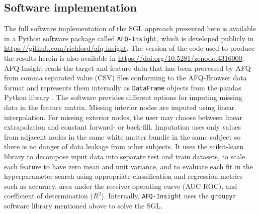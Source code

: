 \documentclass[10pt,letterpaper]{article}
\begin{document}
\begin{figure}[h!]
\end{figure}

\subsection*{Software implementation}

The full software implementation of the SGL approach presented here is available
in a Python software package called \texttt{AFQ-Insight}, which is developed
publicly in \url{https://github.com/richford/afq-insight}.
The version of the code used to produce the results herein is also available in
\url{https://doi.org/10.5281/zenodo.4316000}.
AFQ-Insight reads the target and feature data that has been processed by AFQ
from comma separated value (CSV) files conforming to the AFQ-Browser data
format \cite{yeatman2018browser} and represents them internally as
\lstinline|DataFrame| objects from the pandas Python library
\cite{mckinney2010data}. The software provides different options for imputing
missing data in the feature matrix. Missing interior nodes are imputed using
linear interpolation. For missing exterior nodes, the user may choose between
linear extrapolation and constant forward- or back-fill. Imputation uses only
values from adjacent nodes in the same white matter bundle in the same
subject so there is no danger of data leakage from other subjects. It uses
the scikit-learn \cite{scikit-learn} library to decompose input data into
separate test and train datasets, to scale each feature to have zero mean and
unit variance, and to evaluate each fit in the hyperparameter search using
appropriate classification and regression metrics such as accuracy, area
under the receiver operating curve (AUC ROC), and coefficient of
determination ($R^2$). Internally, \texttt{AFQ-Insight} uses the
\texttt{groupyr} software library \cite{groupyr} mentioned above to solve the
SGL.
\end{document}
